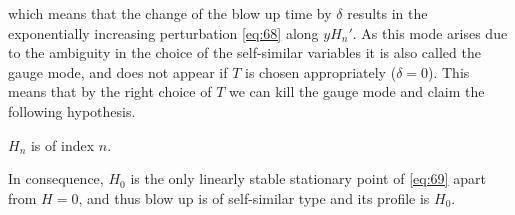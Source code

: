 which means that the change of the blow up time by $\delta$ results in
the exponentially increasing perturbation \eqref{eq:68} along
$yH_n'$. As this mode arises due to the ambiguity in the choice of the
self-similar variables it is also called the gauge mode, and does not
appear if $T$ is chosen appropriately ($\delta=0$). This means that by
the right choice of $T$ we can kill the gauge mode and claim the
following hypothesis.

\begin{conjecture}
  $H_n$ is of index $n$.
\end{conjecture}

In consequence, $H_0$ is the only linearly stable stationary point of
\eqref{eq:69} apart from $H=0$, and thus blow up is of self-similar
type and its profile is $H_0$.



